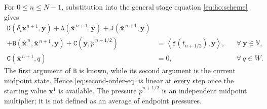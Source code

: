 \documentclass[11pt,a4paper]{article}
\newcommand{\bs}{\boldsymbol}
\newcommand{\V}{\mathbb V}
\newcommand{\DD}{\mathtt D}
\newcommand{\Aform}{\mathtt A}
\newcommand{\JJ}{\mathtt J}
\newcommand{\BB}{\mathtt B}
\newcommand{\CC}{\mathtt C}
\newcommand{\ff}{\mathtt f}
\newcommand{\pp}{\widetilde p}
\newcommand{\dual}[2]{\left\langle#1,#2\right\rangle}
\theoremstyle{definition}
\numberwithin{equation}{section}
\begin{document}
For $0\le n\le N-1$, substitution into the general stage equation \eqref{eq:ho:scheme} gives
\begin{equation}\label{eq:second-order-eq}
\begin{aligned}
 \DD(\delta_t\bs x^{n+1},\bs y)
 +\Aform(\bar{\bs x}^{\,n+1},\bs y)
 +\JJ(\bar{\bs x}^{\,n+1},\bs y) & \\
 +\BB(\widehat{\bs x}^{\,n},\bar{\bs x}^{\,n+1},\bs y)
 +\CC(\bs y,\pp^{\,n+1/2})
 &=
 \dual{\ff(t_{n+1/2})}{\bs y},&& \forall~\bs y \in \V,\\
 \CC(\bar{\bs x}^{\,n+1},q)&=0, & & \forall~q \in W.
\end{aligned}
\end{equation}
The first argument of \(\BB\) is known, while its second argument is
the current midpoint state. Hence \eqref{eq:second-order-eq} is linear at every
step once the starting value \(\bs x^1\) is available. The pressure
\(\pp^{n+1/2}\) is an independent midpoint multiplier; it is not
defined as an average of endpoint pressures.
\end{document}
